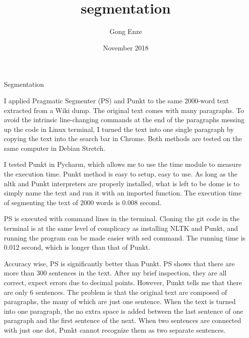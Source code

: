\documentclass{article}
\title{\Huge \textbf{segmentation}}
\author{Gong Enze }
\date{November 2018}
\begin{document}
\maketitle

\newpage

\begin{large}

\centerline{Segmentation} 

I applied Pragmatic Segmenter (PS) and Punkt to the same 2000-word text extracted from a Wiki dump. The original text comes with many paragraphs. To avoid the intrinsic line-changing commands at the end of the paragraphs messing up the code in Linux terminal, I turned the text into one single paragraph by copying the text into the search bar in Chrome.  Both methods are tested on the same computer in Debian Stretch. 

I tested Punkt in Pycharm, which allows me to use the time module to measure the execution time. Punkt method is easy to setup, easy to use. As long as the nltk and Punkt interpreters are properly installed, what is left to be dome is to simply name the text and run it with an imported function. The execution time of segmenting the text of 2000 words is 0.008 second. 

PS is executed with command lines in the terminal. Cloning the git code in the terminal is at the same level of complicacy as installing NLTK and Punkt, and running the program can be made easier with sed command. The running time is 0.012 second, which is longer than that of Punkt. 

Accuracy wise, PS is significantly better than Punkt. PS shows that there are more than 300 sentences in the text. After my brief inspection, they are all correct, expect errors due to decimal points. However, Punkt tells me that there are only 6 sentences. The problem is that the original text are composed of paragraphs, the many of which are just one sentence. When the text is turned into one paragraph, the no extra space is added between the last sentence of one paragraph and the first sentence of the next. When two sentences are connected with just one dot, Punkt cannot recognize them as two separate sentences.

\end{large}
\end{document}

